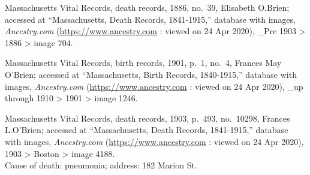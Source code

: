 \begin{thebibliography}{99}
	Massachusetts Vital Records, death records, 1886, no.\ 39, Elisabeth O.Brien; accessed at ``Massachusetts, Death Records, 1841-1915,'' database with images, \textit{Ancestry.com} (\url{https://www.ancestry.com} : viewed on 24 Apr 2020), \_Pre 1903 > 1886 > image 704.	
	
	Massachusetts Vital Records, birth records, 1901, p.\ 1, no.\ 4, Frances May O'Brien; accessed at ``Massachusetts, Birth Records, 1840-1915,'' database with images, \textit{Ancestry.com} (\url{https://www.ancestry.com} : viewed on 24 Apr 2020), \_up through 1910 > 1901 > image 1246.
	
	Massachusetts Vital Records, death records, 1903, p.\ 493, no.\ 10298, Frances L.O'Brien; accessed at ``Massachusetts, Death Records, 1841-1915,'' database with images, \textit{Ancestry.com} (\url{https://www.ancestry.com} : viewed on 24 Apr 2020), 1903 > Boston > image 4188.\\
	Cause of death: pneumonia; address: 182 Marion St.

\end{thebibliography}